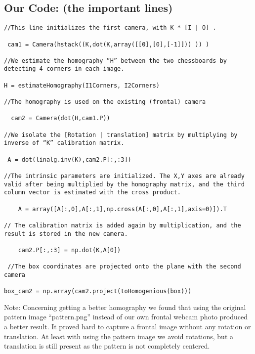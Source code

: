 \subsection{Our Code: (the important lines)}

\begin{verbatim}
//This line initializes the first camera, with K * [I | O] .

 cam1 = Camera(hstack((K,dot(K,array([[0],[0],[-1]])) )) )

//We estimate the homography “H” between the two chessboards by detecting 4 corners in each image.

H = estimateHomography(I1Corners, I2Corners)

//The homography is used on the existing (frontal) camera

  cam2 = Camera(dot(H,cam1.P))

//We isolate the [Rotation | translation] matrix by multiplying by inverse of “K” calibration matrix.

 A = dot(linalg.inv(K),cam2.P[:,:3]) 

//The intrinsic parameters are initialized. The X,Y axes are already valid after being multiplied by the homography matrix, and the third column vector is estimated with the cross product.

    A = array([A[:,0],A[:,1],np.cross(A[:,0],A[:,1],axis=0)]).T

// The calibration matrix is added again by multiplication, and the result is stored in the new camera.

    cam2.P[:,:3] = np.dot(K,A[0])

 //The box coordinates are projected onto the plane with the second camera

box_cam2 = np.array(cam2.project(toHomogenious(box)))
\end{verbatim}

Note: Concerning getting a better homography we found that using the
original pattern image “pattern.png” instead of our own frontal webcam
photo produced a better result. It proved hard to capture a frontal image
without any rotation or translation. At least with using the pattern image we
avoid rotations, but a translation is still present as the pattern is not
completely centered. 
